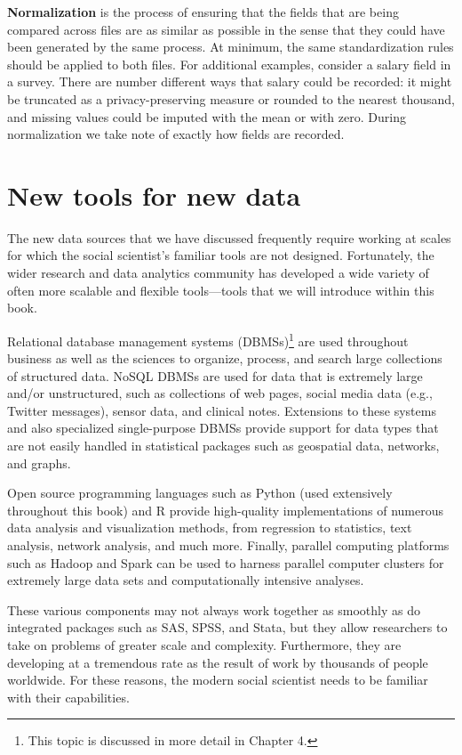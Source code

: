 \documentclass[]{krantz}
\begin{document}
\textbf{Normalization} is the process of ensuring that the fields that
are being compared across files are as similar as possible in the sense
that they could have been generated by the same process. At minimum, the
same standardization rules should be applied to both files. For
additional examples, consider a salary field in a survey. There are
number different ways that salary could be recorded: it might be
truncated as a privacy-preserving measure or rounded to the nearest
thousand, and missing values could be imputed with the mean or with
zero. During normalization we take note of exactly how fields are
recorded.

\section{New tools for new data}\label{new-tools-for-new-data}

The new data sources that we have discussed frequently require working
at scales for which the social scientist's familiar tools are not
designed. Fortunately, the wider research and data analytics community
has developed a wide variety of often more scalable and flexible
tools---tools that we will introduce within this book.

Relational database management systems (DBMSs)\footnote{This topic is
  discussed in more detail in Chapter 4.} are used throughout business
as well as the sciences to organize, process, and search large
collections of structured data. NoSQL DBMSs are used for data that is
extremely large and/or unstructured, such as collections of web pages,
social media data (e.g., Twitter messages), sensor data, and clinical
notes. Extensions to these systems and also specialized single-purpose
DBMSs provide support for data types that are not easily handled in
statistical packages such as geospatial data, networks, and graphs.

Open source programming languages such as Python (used extensively
throughout this book) and R provide high-quality implementations of
numerous data analysis and visualization methods, from regression to
statistics, text analysis, network analysis, and much more. Finally,
parallel computing platforms such as Hadoop and Spark can be used to
harness parallel computer clusters for extremely large data sets and
computationally intensive analyses.

These various components may not always work together as smoothly as do
integrated packages such as SAS, SPSS, and Stata, but they allow
researchers to take on problems of greater scale and complexity.
Furthermore, they are developing at a tremendous rate as the result of
work by thousands of people worldwide. For these reasons, the modern
social scientist needs to be familiar with their capabilities.
\end{document}
